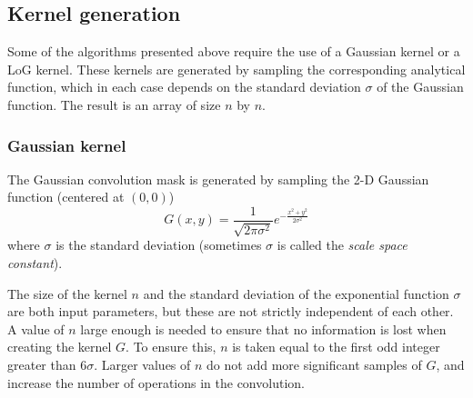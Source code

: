 \documentclass{ipol}
\numberwithin{equation}{section}
\numberwithin{table}{section}
\begin{document}
{%


\subsection{Kernel generation}

Some of the algorithms presented above require the use of a Gaussian kernel or a LoG kernel. These 
kernels are generated by sampling the corresponding analytical function, which in each case depends 
on the standard deviation $\sigma$ of the Gaussian function. The result is an array of 
size $n$ by $n$.



\subsubsection{Gaussian kernel}

The Gaussian convolution mask is generated by sampling the 2-D Gaussian function (centered at $(0,0)$)
\begin{equation}
	\label{eq:gaussian_function}
	G(x,y) = \frac{1}{\sqrt{2\pi\sigma^2}}e^{-\frac{x^2+y^2}{2\sigma^2}}
\end{equation}
where $\sigma$ is the standard deviation (sometimes $\sigma$ is called the \textit{scale space constant}).

The size of the kernel $n$ and the standard deviation of the exponential function $\sigma$ are both 
input parameters, but these are not strictly independent of each other. 
A value of $n$ large enough is needed to ensure that no information is lost when creating the kernel $G$. To ensure this, $n$ is taken equal to the first odd integer greater than $6\sigma$. Larger values of $n$ do not add more significant samples ​​of $G$, and increase the number of operations in the convolution.

}
\end{document}
